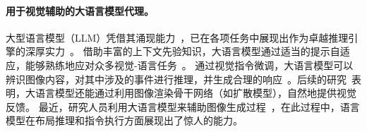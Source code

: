 \paragraph{用于视觉辅助的大语言模型代理。}
大型语言模型（LLM）凭借其涌现能力~\citep{wei2022emergent}，已在各项任务中展现出作为卓越推理引擎的深厚实力~\citep{zhuge2023mindstorms,wei2022chain,huang2022towards,Touvron2023LLaMAOA,brown2020language}。
借助丰富的上下文先验知识，大语言模型通过适当的提示自适应，能够熟练地应对众多视觉-语言任务~\citep{zhuge2024language,alayrac2022flamingo,zhang2023multimodal,chakrabarty2023spy}。
通过视觉指令微调，大语言模型可以辨识图像内容，对其中涉及的事件进行推理，并生成合理的响应~\citep{li2023blip,liu2024visual,zhu2023minigpt}。后续的研究~\citep{koh2024generating,sun2023generative,wu2023visual}表明，大语言模型还能通过利用图像渲染骨干网络（如扩散模型），自然地提供视觉反馈。
最近，研究人员利用大语言模型来辅助图像生成过程~\citep{NEURIPS2023_3a7f9e48,fu2023guiding}，在此过程中，语言模型在布局推理和指令执行方面展现出了惊人的能力。
